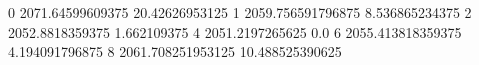 0 2071.64599609375 20.42626953125
1 2059.756591796875 8.536865234375
2 2052.8818359375 1.662109375
4 2051.2197265625 0.0
6 2055.413818359375 4.194091796875
8 2061.708251953125 10.488525390625
